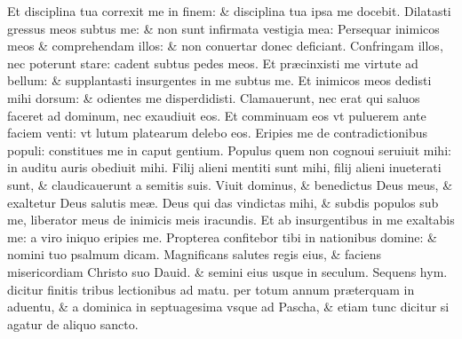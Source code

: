 \documentclass[a5paper,10pt]{book}
\def\ae{æ}
\begin{document}
\begin{multicols*}{2}
\newline \color{red} E\color{black}t disciplina tua correxit me in finem: \& disciplina tua ipsa me docebit.
\newline \color{red} D\color{black}ilatasti gressus meos subtus me: \& non sunt infirmata vestigia mea:
\newline \color{red} P\color{black}ersequar inimicos meos \& comprehendam illos: \& non conuertar donec deficiant.
\newline \color{red} C\color{black}onfringam illos, nec poterunt stare: cadent subtus pedes meos.
\newline \color{red} E\color{black}t pr\ae cinxisti me virtute ad bellum: \& supplantasti insurgentes in me subtus me.
\newline \color{red} E\color{black}t inimicos meos dedisti mihi dorsum: \& odientes me disperdidisti.
\newline \color{red} C\color{black}lamauerunt, nec erat qui saluos faceret ad dominum, nec exaudiuit eos.
\newline \color{red} E\color{black}t comminuam eos vt puluerem ante faciem venti: vt lutum platearum delebo eos.%
\newline \color{red} E\color{black}ripies me de contradictionibus populi: constitues me in caput gentium.
\newline \color{red} P\color{black}opulus quem non cognoui seruiuit mihi: in auditu auris obediuit mihi.
\newline \color{red} F\color{black}ilij alieni mentiti sunt mihi, filij alieni inueterati sunt, \& claudicauerunt a semitis suis.
\newline \color{red} V\color{black}iuit dominus, \& benedictus Deus meus, \& exaltetur Deus salutis me\ae .
\newline \color{red} D\color{black}eus qui das vindictas mihi, \& subdis populos sub me, liberator meus de inimicis meis iracundis.
\newline \color{red} E\color{black}t ab insurgentibus in me exaltabis me: a viro iniquo eripies me.
\newline \color{red} P\color{black}ropterea confitebor tibi in nationibus domine: \& nomini tuo psalmum dicam.
\newline \color{red} M\color{black}agnificans salutes regis eius, \& faciens misericordiam Christo suo Dauid. \& semini eius usque in seculum.
\newline {} \color{red} Sequens hym. dicitur %
finitis tribus lectionibus ad matu. per totum annum pr\ae terquam in aduentu, \& a dominica in septuagesima vsque ad Pascha, \& etiam tunc dicitur si agatur de aliquo sancto. \color{black}

\end{multicols*}
\end{document}
